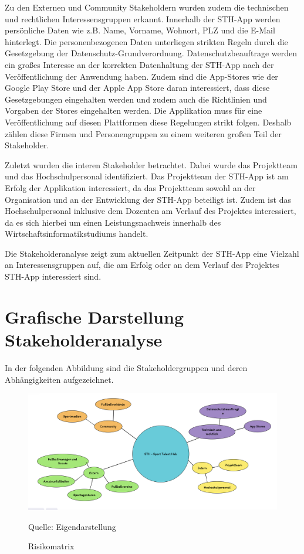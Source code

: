 \noindent
Zu den Externen und Community Stakeholdern wurden zudem die technischen und rechtlichen Interessensgruppen erkannt.
Innerhalb der STH-App werden persönliche Daten wie z.B. Name, Vorname, Wohnort, PLZ und die E-Mail hinterlegt.
Die personenbezogenen Daten unterliegen strikten Regeln durch die Gesetzgebung der Datenschutz-Grundverordnung.
Datenschutzbeauftrage werden ein großes Interesse an der korrekten Datenhaltung der STH-App nach der Veröffentlichung der Anwendung haben.
Zudem sind die App-Stores wie der Google Play Store und der Apple App Store daran interessiert, dass diese Gesetzgebungen eingehalten werden und zudem auch die Richtlinien und Vorgaben der Stores eingehalten werden.
Die Applikation muss für eine Veröffentlichung auf diesen Plattformen diese Regelungen strikt folgen.
Deshalb zählen diese Firmen und Personengruppen zu einem weiteren großen Teil der Stakeholder.

\noindent
Zuletzt wurden die interen Stakeholder betrachtet.
Dabei wurde das Projektteam und das Hochschulpersonal identifiziert.
Das Projektteam der STH-App ist am Erfolg der Applikation interessiert, da das Projektteam sowohl an der Organisation und an der Entwicklung der STH-App beteiligt ist.
Zudem ist das Hochschulpersonal inklusive dem Dozenten am Verlauf des Projektes interessiert, da es sich hierbei um einen Leistungsnachweis innerhalb des Wirtschaftsinformatikstudiums handelt.

\noindent
Die Stakeholderanalyse zeigt zum aktuellen Zeitpunkt der STH-App eine Vielzahl an Interessensgruppen auf, die am Erfolg oder an dem Verlauf des Projektes STH-App interessiert sind.


\section{Grafische Darstellung Stakeholderanalyse}

In der folgenden Abbildung sind die Stakeholdergruppen und deren Abhängigkeiten aufgezeichnet.

\begin{figure}[H]
    \centering
    \includegraphics[width=1\textwidth]{assets/figures/stakeholderanalyse.png}
    \caption[Risikomatrix]{Risikomatrix}
    \begin{flushleft}
        Quelle: Eigendarstellung
    \end{flushleft}
\end{figure}

